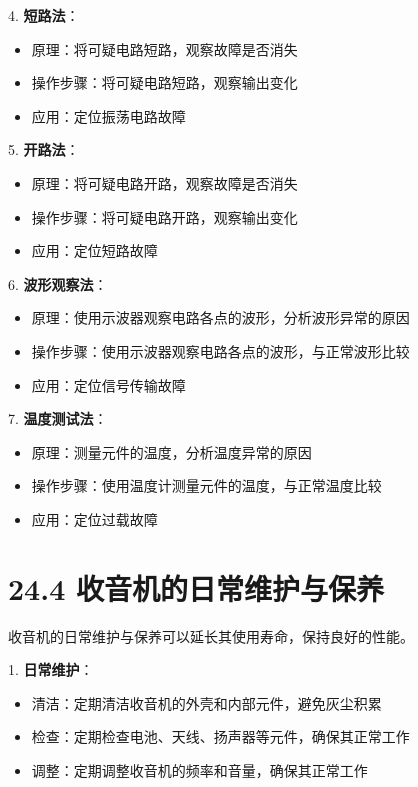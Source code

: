 \documentclass[12pt,UTF8]{ctexbook}
\begin{document}
4. \textbf{短路法}：
   \begin{itemize}[leftmargin=3.5em]
   \item 原理：将可疑电路短路，观察故障是否消失
   \item 操作步骤：将可疑电路短路，观察输出变化
   \item 应用：定位振荡电路故障
   \end{itemize}

5. \textbf{开路法}：
   \begin{itemize}[leftmargin=3.5em]
   \item 原理：将可疑电路开路，观察故障是否消失
   \item 操作步骤：将可疑电路开路，观察输出变化
   \item 应用：定位短路故障
   \end{itemize}

6. \textbf{波形观察法}：
   \begin{itemize}[leftmargin=3.5em]
   \item 原理：使用示波器观察电路各点的波形，分析波形异常的原因
   \item 操作步骤：使用示波器观察电路各点的波形，与正常波形比较
   \item 应用：定位信号传输故障
   \end{itemize}

7. \textbf{温度测试法}：
   \begin{itemize}[leftmargin=3.5em]
   \item 原理：测量元件的温度，分析温度异常的原因
   \item 操作步骤：使用温度计测量元件的温度，与正常温度比较
   \item 应用：定位过载故障
   \end{itemize}

\section*{24.4 收音机的日常维护与保养}

收音机的日常维护与保养可以延长其使用寿命，保持良好的性能。

1. \textbf{日常维护}：
   \begin{itemize}[leftmargin=3.5em]
   \item 清洁：定期清洁收音机的外壳和内部元件，避免灰尘积累
   \item 检查：定期检查电池、天线、扬声器等元件，确保其正常工作
   \item 调整：定期调整收音机的频率和音量，确保其正常工作
   \end{itemize}
\end{document}
